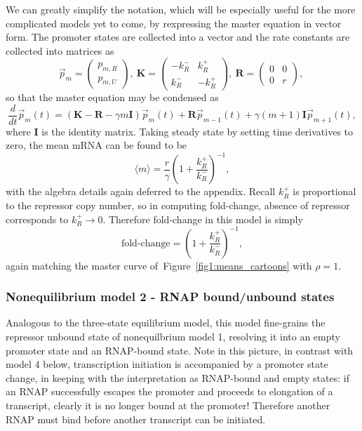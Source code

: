 \documentclass[12pt]{article}%
\newcommand{\vect}[1]{\vec{#1}}
\newcommand{\matr}[1]{\mathbf{#1}}
\newcommand{\deriv}[2][{}]{\frac{d #1}{d #2}}
\newcommand{\fig}[1]{Figure~\ref{#1}}
\begin{document}
We can greatly simplify the notation, which will be especially
useful for the more complicated models yet to come, by
rexpressing the master equation in vector form. The promoter
states are collected into a vector and the rate constants are
collected into matrices as
\begin{equation}
\vect{p}_m = \begin{pmatrix} p_{m,R} \\ p_{m,U} \end{pmatrix},\
\matr{K} = \begin{pmatrix} -k_R^- & k_R^+ \\ k_R^- & -k_R^+ \end{pmatrix},\
\matr{R} = \begin{pmatrix} 0 & 0 \\ 0 & r \end{pmatrix},\
\label{eq:2state_cme_matrices}
\end{equation}
so that the master equation may be condensed as
\begin{equation}
\deriv{t}\vect{p}_m(t) =
\left( \matr{K} - \matr{R} - \gamma m \matr{I} \right) \vect{p}_m(t)
                + \matr{R} \vect{p}_{m-1}(t) +
                \gamma (m+1) \matr{I} \vect{p}_{m+1}(t),
\label{eq:2state_rep_cme}
\end{equation}
where $\matr{I}$ is the identity matrix.
Taking steady state by setting time derivatives to zero,
the mean mRNA can be found to be
\begin{equation}
\langle m \rangle = \frac{r}{\gamma}
        \left(1 + \frac{k_R^+}{k_R^-}\right)^{-1},
\end{equation}
with the algebra details again deferred to the appendix.
Recall $k_R^+$ is proportional to the repressor copy number, so
in computing fold-change, absence of repressor corresponds to
$k_R^+\rightarrow0$.
Therefore fold-change in this model is simply
\begin{equation}
\text{fold-change} = \left(1 + \frac{k_R^+}{k_R^-}\right)^{-1},
\end{equation}
again matching the master curve of~\fig{fig1:means_cartoons} with $\rho=1$.

\subsubsection{Nonequilibrium model 2 - RNAP bound/unbound states}
Analogous to the three-state equilibrium model, this model
fine-grains the repressor unbound state of nonequilbrium model 1,
resolving it into an empty promoter state and an RNAP-bound state.
Note in this picture, in contrast with model 4 below,
transcription initiation is accompanied by a promoter state
change, in keeping with the interpretation as RNAP-bound and
empty states: if an RNAP successfully escapes the promoter and
proceeds to elongation of a transcript, clearly it is no longer
bound at the promoter! Therefore another RNAP must bind before
another transcript can be initiated.
\end{document}

